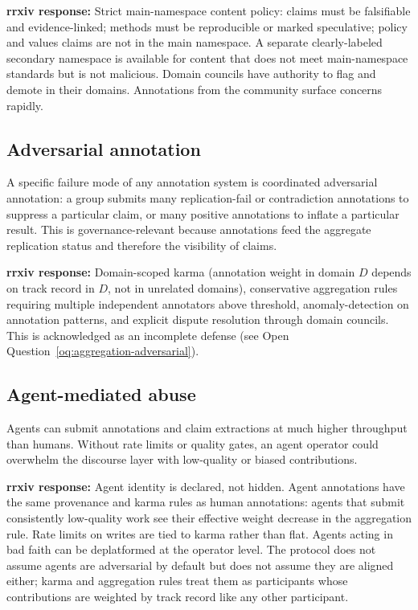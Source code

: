 \documentclass[11pt]{rrxiv}
\begin{document}
\textbf{rrxiv response:} Strict main-namespace content policy: claims must be falsifiable and evidence-linked; methods must be reproducible or marked speculative; policy and values claims are not in the main namespace. A separate clearly-labeled secondary namespace is available for content that does not meet main-namespace standards but is not malicious. Domain councils have authority to flag and demote in their domains. Annotations from the community surface concerns rapidly.

\subsection{Adversarial annotation}

A specific failure mode of any annotation system is coordinated adversarial annotation: a group submits many replication-fail or contradiction annotations to suppress a particular claim, or many positive annotations to inflate a particular result. This is governance-relevant because annotations feed the aggregate replication status and therefore the visibility of claims.

\textbf{rrxiv response:} Domain-scoped karma (annotation weight in domain $D$ depends on track record in $D$, not in unrelated domains), conservative aggregation rules requiring multiple independent annotators above threshold, anomaly-detection on annotation patterns, and explicit dispute resolution through domain councils. This is acknowledged as an incomplete defense (see Open Question~\ref{oq:aggregation-adversarial}).

\subsection{Agent-mediated abuse}

Agents can submit annotations and claim extractions at much higher throughput than humans. Without rate limits or quality gates, an agent operator could overwhelm the discourse layer with low-quality or biased contributions.

\textbf{rrxiv response:} Agent identity is declared, not hidden. Agent annotations have the same provenance and karma rules as human annotations: agents that submit consistently low-quality work see their effective weight decrease in the aggregation rule. Rate limits on writes are tied to karma rather than flat. Agents acting in bad faith can be deplatformed at the operator level. The protocol does not assume agents are adversarial by default but does not assume they are aligned either; karma and aggregation rules treat them as participants whose contributions are weighted by track record like any other participant.
\end{document}
